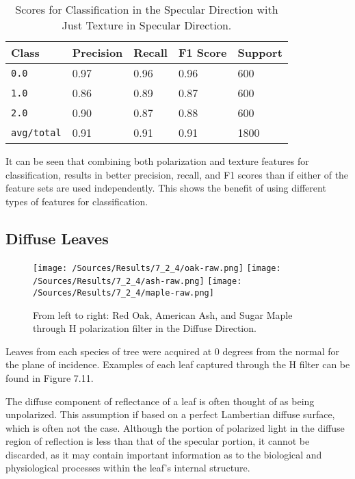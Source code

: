 %
\begin{table}[htb]
  \centering
  \begin{tabular}{lllll}
    \toprule
    \textbf{Class} & \textbf{Precision} & \textbf{Recall} & \textbf{F1 Score} & Support\\
    \midrule
      \texttt{0.0} & 0.97 & 0.96 & 0.96 & 600 \\
      \texttt{1.0} & 0.86 & 0.89 & 0.87 & 600 \\
      \texttt{2.0} & 0.90 & 0.87 & 0.88 & 600 \\
      \texttt{avg/total} & 0.91 & 0.91 & 0.91 & 1800 \\
    \bottomrule
  \end{tabular}
  \caption{%
    Scores for Classification in the Specular Direction with Just Texture in Specular Direction.
  }
  \label{tab:Packages}
\end{table}
%
It can be seen that combining both polarization and texture features for classification, results in better precision, recall, and F1 scores than if either of the feature sets are used independently.  This shows the benefit of using different types of features for classification.

\subsection{Diffuse Leaves}
%
\begin{figure}[htp]
    \centering
    \texttt{[image: /Sources/Results/7\_2\_4/oak-raw.png]}\hfill
    \texttt{[image: /Sources/Results/7\_2\_4/ash-raw.png]}\hfill
    \texttt{[image: /Sources/Results/7\_2\_4/maple-raw.png]}

    \caption{From left to right: Red Oak, American Ash, and Sugar Maple through H polarization filter in the Diffuse Direction.}
    \label{fig:specular-raw}
\end{figure}
%
Leaves from each species of tree were acquired at 0 degrees from the normal for the plane of incidence.  Examples of each leaf captured through the H filter can be found in Figure 7.11.

The diffuse component of reflectance of a leaf is often thought of as being unpolarized.  This assumption if based on a perfect Lambertian diffuse surface, which is often not the case.  Although the portion of polarized light in the diffuse region of reflection is less than that of the specular portion, it cannot be discarded, as it may contain important information as to the biological and physiological processes within the leaf's internal structure.

